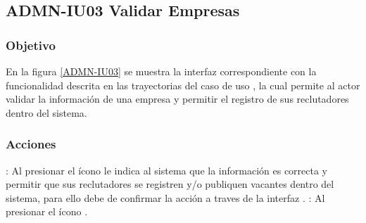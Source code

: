 \clearpage
\subsection{ADMN-IU03 Validar Empresas}

\subsubsection{Objetivo}
En la figura \ref{ADMN-IU03} se muestra la interfaz correspondiente con la funcionalidad descrita en las trayectorias del caso de uso , 
la cual permite al actor validar la información de una empresa y permitir el registro de sus reclutadores dentro del sistema.

\subsubsection{Acciones}
\Titem \IUAprobarE{} : Al presionar el ícono le indica al sistema que la información es correcta y permitir que sus reclutadores se registren y/o publiquen vacantes dentro del sistema, para ello debe de confirmar la acción a traves de la interfaz .
\Titem {} : Al presionar el ícono .

  

\clearpage
